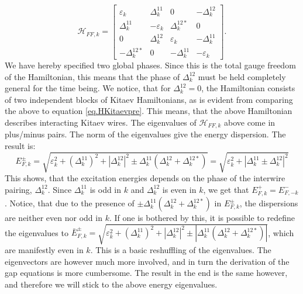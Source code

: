 \begin{equation}
\mathcal{H}_{FF,k} = \begin{bmatrix} \varepsilon_{k}   & \Delta^{11}_k      & 0                 & -\Delta^{12}_{k} \\ 
                                     \Delta^{11}_k     & -\varepsilon_{k}   & \Delta^{12*}_k    & 0 \\ 
                                    0                  & \Delta^{12}_k      & \varepsilon_{k}   & -\Delta^{11}_k \\ 
                                     -\Delta^{12*}_{k} & 0                  & -\Delta^{11}_k     & -\varepsilon_{k} \end{bmatrix}.                  
\end{equation}
We have hereby specified two global phases. Since this is the total gauge freedom of the Hamiltonian, this means that the phase of $\Delta^{12}_k$ must be held completely general for the time being. We notice, that for $\Delta^{12}_{k} = 0$, the Hamiltonian consists of two independent blocks of Kitaev Hamiltonians, as is evident from comparing the above to equation \ref{eq.HKitaevpre}. This means, that the above Hamiltonian describes interacting Kitaev wires. The eigenvalues of $\mathcal{H}_{FF,k}$ above come in plus/minus pairs. The norm of the eigenvalues give the energy dispersion. The result is:
\begin{equation}
E^{\pm}_{F,k} = \sqrt{\varepsilon^2_k + \left(\Delta^{11}_k\right)^2 + \left|\Delta^{12}_k\right|^2 \pm \Delta^{11}_k(\Delta^{12}_k + \Delta^{12*}_k)} = \sqrt{\varepsilon_k^2 + |\Delta^{11}_k \pm \Delta^{12}_k|^2}
\end{equation} 
This shows, that the excitation energies depends on the phase of the interwire pairing, $\Delta^{12}_k$. Since $\Delta^{11}_k$ is odd in $k$ and $\Delta^{12}_k$ is even in $k$, we get that $E^{+}_{F,k} = E^{-}_{F,-k}$. Notice, that due to the presence of $\pm \Delta^{11}_k(\Delta^{12}_k + \Delta^{12*}_k)$ in $E^{\pm}_{F,k}$, the dispersions are neither even nor odd in $k$. If one is bothered by this, it is possible to redefine the eigenvalues to $\bar{E}^{\pm}_{F,k} = \sqrt{\varepsilon^2_k + \left(\Delta^{11}_k\right)^2 + \left|\Delta^{12}_k\right|^2 \pm |\Delta^{11}_k(\Delta^{12}_k + \Delta^{12*}_k)|}$, which are manifestly even in $k$. This is a basic reshuffling of the eigenvalues. The eigenvectors are however much more involved, and in turn the derivation of the gap equations is more cumbersome. The result in the end is the same however, and therefore we will stick to the above energy eigenvalues.  

